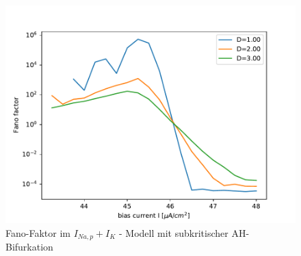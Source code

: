 \documentclass[12pt,a4paper]{article}
\begin{document}
\begin{figure}[H]
	\centering
	\includegraphics[scale=1]{fneurrealanhopf22j3.pdf}\caption{Fano-Faktor im $I_{Na,p}+I_K$ - Modell mit subkritischer AH-Bifurkation}
	\label{fanoanhopf}
\end{figure}
\end{document}
